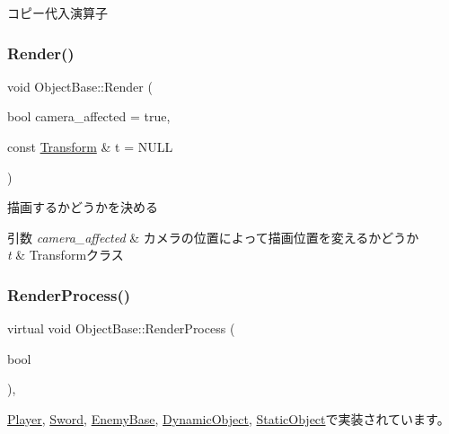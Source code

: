 コピー代入演算子 

\mbox{\label{class_object_base_ac84be5b56d23b8809ca08e27c0dcb16a}} 
\subsubsection{\texorpdfstring{Render()}{Render()}}
{\footnotesize\ttfamily void Object\+Base\+::\+Render (\begin{DoxyParamCaption}\item[{bool}]{camera\+\_\+affected = {\ttfamily true},  }\item[{const \mbox{\hyperlink{class_transform}{Transform}} \&}]{t = {\ttfamily NULL} }\end{DoxyParamCaption})}



描画するかどうかを決める 


\begin{DoxyParams}{引数}
{\em camera\+\_\+affected} & カメラの位置によって描画位置を変えるかどうか \\
\hline
{\em t} & Transformクラス \\
\hline
\end{DoxyParams}
\mbox{\label{class_object_base_aeac51d868beeb7f7fe900407b76b93a2}} 
\subsubsection{\texorpdfstring{Render\+Process()}{RenderProcess()}}
{\footnotesize\ttfamily virtual void Object\+Base\+::\+Render\+Process (\begin{DoxyParamCaption}\item[{bool}]{ }\end{DoxyParamCaption})\hspace{0.3cm}{\ttfamily [protected]}, {}}



\mbox{\hyperlink{class_player_a8ac2e54fe5672d32186456b9735c02c3}{Player}}, \mbox{\hyperlink{class_sword_a7f5d2c6e6e0104e9a85f600eec14ef6d}{Sword}}, \mbox{\hyperlink{class_enemy_base_af874ce6fc410fddc7d55ffd7c7bedac8}{Enemy\+Base}}, \mbox{\hyperlink{class_dynamic_object_aa7488e1b4dfd7049447535d93d9d6783}{Dynamic\+Object}}, \mbox{\hyperlink{class_static_object_afec57009537695c4715386120a619942}{Static\+Object}}で実装されています。

